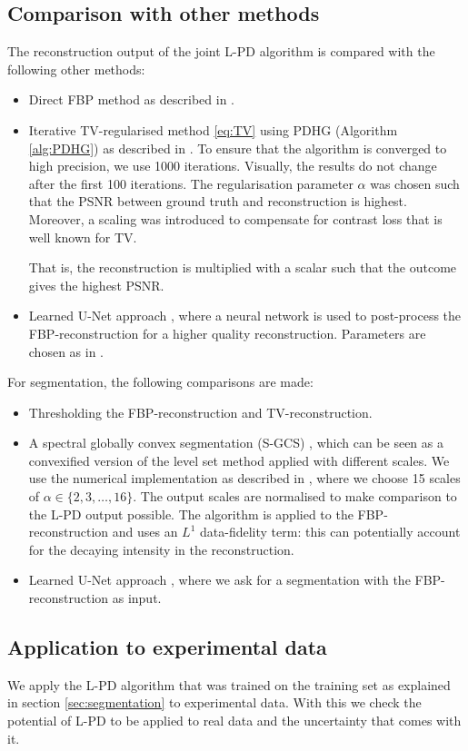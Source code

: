 \documentclass[journal]{IEEEtran}
\newcommand{\hl}[1]{\cbcolor{red}\begin{changebar}{\color{red} #1}\end{changebar}}
\begin{document}
\subsection{Comparison with other methods}\label{sec:comparison}
{The reconstruction output of the joint L-PD algorithm is compared with the following other methods:
\begin{itemize}
\item Direct FBP method as described in \cite{Willemink2010}.
\item Iterative TV-regularised method \eqref{eq:TV} using PDHG (Algorithm \ref{alg:PDHG}) as described in \cite{Boink2018}. To ensure that the algorithm is converged to high precision, we use 1000 iterations. Visually, the results do not change after the first 100 iterations. The regularisation parameter $\alpha$ was chosen such that the PSNR between ground truth and reconstruction is highest. Moreover, a scaling was introduced to compensate for contrast loss that is well known for TV. \hl{That is, the reconstruction is multiplied with a scalar such that the outcome gives the highest PSNR.}
\item Learned U-Net approach \cite{Jin2017}, where a neural network is used to post-process the FBP-reconstruction for a higher quality reconstruction. Parameters are chosen as in \cite{Jin2017}. 
\end{itemize}
For segmentation, the following comparisons are made:
\begin{itemize}
\item Thresholding the FBP-reconstruction and TV-reconstruction.
\item A spectral globally convex segmentation (S-GCS) \cite{Zeune2017}, which can be seen as a convexified version of the level set method \cite{Goldstein2010} applied with different scales. We use the numerical implementation as described in \cite{Zeune2017}, where we choose 15 scales of $\alpha\in\{2,3,\dots,16\}$.   The output scales are normalised to make comparison to the L-PD output possible. The algorithm is applied to the FBP-reconstruction and uses an $L^1$ data-fidelity term: this can potentially account for the decaying intensity in the reconstruction. 
\item Learned U-Net approach \cite{Ronneberger2015}, where we ask for a segmentation with the FBP-reconstruction as input.
\end{itemize}
}

\subsection{Application to experimental data}\label{sec:exp_phantom}
{We apply the L-PD algorithm that was trained on the training set as explained in section \ref{sec:segmentation} to experimental data. With this we check the potential of L-PD to be applied to real data and the uncertainty that comes with it.}
\end{document}
